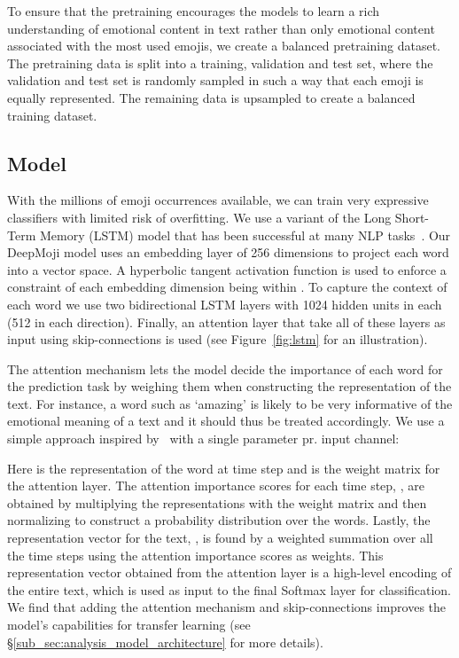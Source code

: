 \documentclass[11pt,a4paper]{article}
\begin{document}
To ensure that the pretraining encourages the models to learn a rich understanding of emotional content in text rather than only emotional content associated with the most used emojis, we create a balanced pretraining dataset. The pretraining data is split into a training, validation and test set, where the validation and test set is randomly sampled in such a way that each emoji is equally represented. The remaining data is upsampled to create a balanced training dataset.

\subsection{Model}
\label{sub_sec:model}

With the millions of emoji occurrences available, we can train very expressive classifiers with limited risk of overfitting. We use a variant of the Long Short-Term Memory (LSTM) model that has been successful at many NLP tasks~\cite{hochreiter1997long, sutskever2014sequence}. Our DeepMoji model uses an embedding layer of 256 dimensions to project each word into a vector space. A hyperbolic tangent activation function is used to enforce a constraint of each embedding dimension being within . To capture the context of each word we use two bidirectional LSTM layers with 1024 hidden units in each (512 in each direction). Finally, an attention layer that take all of these layers as input using skip-connections is used (see Figure~\ref{fig:lstm} for an illustration).

The attention mechanism lets the model decide the importance of each word for the prediction task by weighing them when constructing the representation of the text. For instance, a word such as `amazing' is likely to be very informative of the emotional meaning of a text and it should thus be treated accordingly. We use a simple approach inspired by~\cite{bahdanau2014neural, yang2016hierarchical} with a single parameter pr. input channel:



Here  is the representation of the word at time step  and  is the weight matrix for the attention layer. The attention importance scores for each time step, , are obtained by multiplying the representations with the weight matrix and then normalizing to construct a probability distribution over the words. Lastly, the representation vector for the text, , is found by a weighted summation over all the time steps using the attention importance scores as weights. This representation vector obtained from the attention layer is a high-level encoding of the entire text, which is used as input to the final Softmax layer for classification. We find that adding the attention mechanism and skip-connections improves the model's capabilities for transfer learning (see \S\ref{sub_sec:analysis_model_architecture} for more details). 
\end{document}
